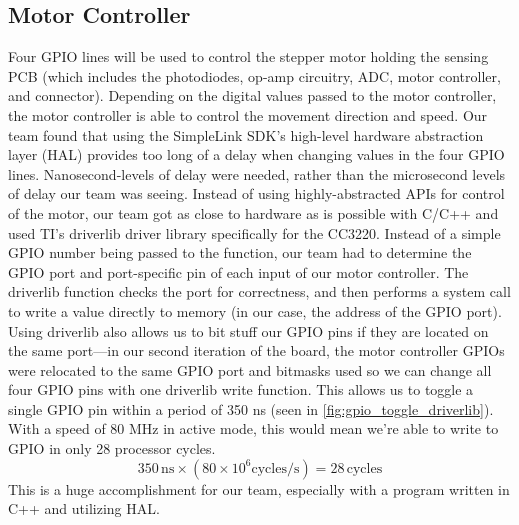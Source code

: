 \documentclass[journal]{IEEEtran}
\begin{document}
\subsection{Motor Controller}
Four GPIO lines will be used to control the stepper motor holding the sensing PCB (which includes the photodiodes, op-amp circuitry, ADC, motor controller, and connector). Depending on the digital values passed to the motor controller, the motor controller is able to control the movement direction and speed. Our team found that using the SimpleLink SDK's high-level hardware abstraction layer (HAL) provides too long of a delay when changing values in the four GPIO lines. Nanosecond-levels of delay were needed, rather than the microsecond levels of delay our team was seeing. Instead of using highly-abstracted APIs for control of the motor, our team got as close to hardware as is possible with C/C++ and used TI's driverlib driver library specifically for the CC3220. Instead of a simple GPIO number being passed to the function, our team had to determine the GPIO port and port-specific pin of each input of our motor controller. The driverlib function checks the port for correctness, and then performs a system call to write a value directly to memory (in our case, the address of the GPIO port). Using driverlib also allows us to bit stuff our GPIO pins if they are located on the same port---in our second iteration of the board, the motor controller GPIOs were relocated to the same GPIO port and bitmasks used so we can change all four GPIO pins with one driverlib write function. This allows us to toggle a single GPIO pin within a period of 350 ns (seen in \ref{fig:gpio_toggle_driverlib}). With a speed of 80 MHz in active mode, this would mean we're able to write to GPIO in only 28 processor cycles.
\begin{equation}
	350\,\mathrm{ns} \times (80\times10^6\mathrm{cycles/s}) = 28\,\mathrm{cycles}
\end{equation}
This is a huge accomplishment for our team, especially with a program written in C++ and utilizing HAL.
\end{document}
